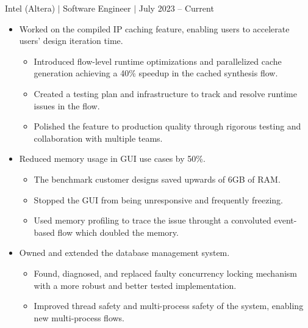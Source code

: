 \documentclass[12pt]{article}
\newcommand{\textDate}[3]{\noindent#1 $|$ #2 $|$ {\color{textGray} #3}}
\begin{document}
    \textDate{Intel (Altera)}{Software Engineer}{July 2023 -- Current}
    \begin{small}
        \begin{itemize}
            \itemsep0em 

            \item {Worked on the compiled IP caching feature, enabling users to accelerate users' design iteration time.}
                \begin{itemize}[label=$\circ$,topsep=-5px,partopsep=0px]
                    \itemsep0em 
                    \item {Introduced flow-level runtime optimizations and parallelized cache generation achieving a 40\% speedup in the cached synthesis flow.}
                    \item {Created a testing plan and infrastructure to track and resolve runtime issues in the flow.}
                    \item {Polished the feature to production quality through rigorous testing and collaboration with multiple teams.}
                \end{itemize}

            \item {Reduced memory usage in GUI use cases by 50\%.}
                \begin{itemize}[label=$\circ$,topsep=-5px,partopsep=0px]
                    \itemsep0em 
                    \item {The benchmark customer designs saved upwards of 6GB of RAM.}
                    \item {Stopped the GUI from being unresponsive and frequently freezing.}
                    \item {Used memory profiling to trace the issue throught a convoluted event-based flow which doubled the memory.}
                \end{itemize}

            \item {Owned and extended the database management system.}
                \begin{itemize}[label=$\circ$,topsep=-5px,partopsep=0px]
                    \itemsep0em 
                    \item {Found, diagnosed, and replaced faulty concurrency locking mechanism with a more robust and better tested implementation.}
                    \item {Improved thread safety and multi-process safety of the system, enabling new multi-process flows.}
                \end{itemize}


\end{itemize}
\end{small}
\end{document}
